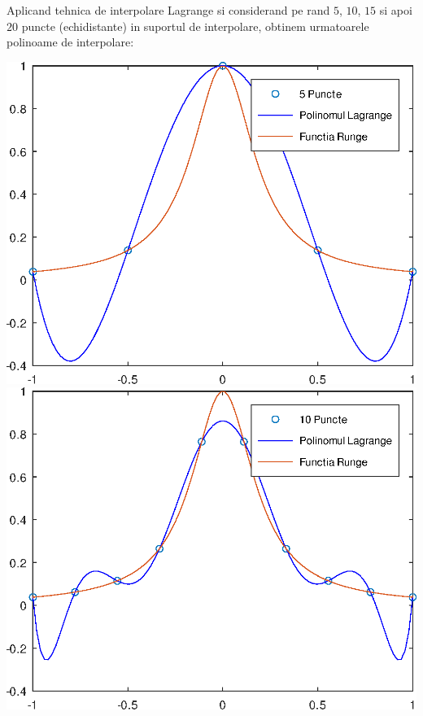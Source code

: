 \documentclass{article}
\begin{document}

Aplicand tehnica de interpolare Lagrange si considerand pe rand $5$, $10$, $15$ si apoi $20$ puncte (echidistante) in suportul de interpolare, obtinem urmatoarele polinoame de interpolare:

\begin{center}
    \includegraphics[scale=0.5]{runge_5points}
    \hspace{0.5cm}\vspace{0.25cm}
    \includegraphics[scale=0.5]{runge_10points}

\end{center}
\end{document}
